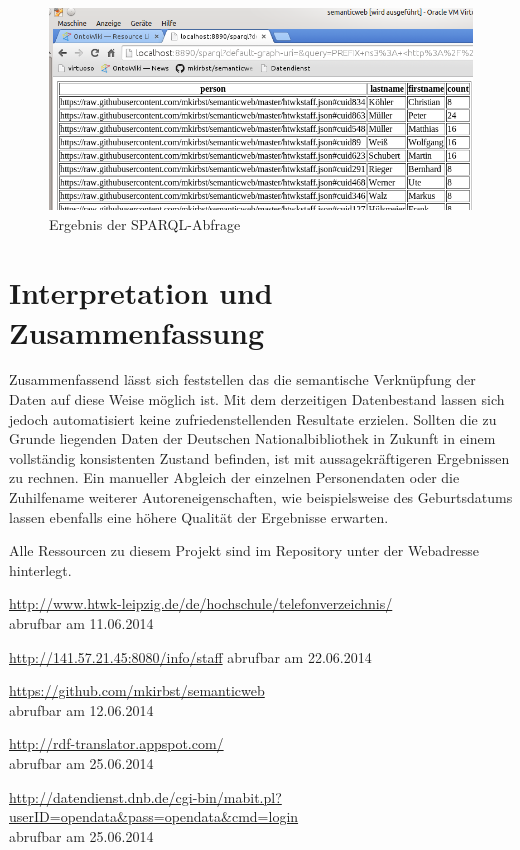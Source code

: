 \documentclass[parskip]{scrartcl}
\begin{document}
\begin{figure}[htb]
\begin{center}
 \includegraphics[width=1\hsize]{./images/querryresult.png}
 \end{center}
\caption[Ergebnis der SPARQL-Abfrage]{\label{querryresult}Ergebnis der SPARQL-Abfrage}
\end{figure}

\section{Interpretation und Zusammenfassung}
Zusammenfassend lässt sich feststellen das die semantische Verknüpfung der Daten auf diese Weise möglich ist. Mit dem derzeitigen Datenbestand lassen sich jedoch automatisiert keine zufriedenstellenden Resultate erzielen.
Sollten die zu Grunde liegenden Daten der Deutschen Nationalbibliothek in Zukunft in einem vollständig konsistenten Zustand befinden, ist mit aussagekräftigeren Ergebnissen zu rechnen. Ein manueller Abgleich der einzelnen Personendaten oder die Zuhilfename weiterer
Autoreneigenschaften, wie beispielsweise des Geburtsdatums lassen ebenfalls eine höhere Qualität der Ergebnisse erwarten.

Alle Ressourcen zu diesem Projekt sind im Repository unter der Webadresse \cite{gitmkirbstsm} hinterlegt.

%
%

\clearpage
\renewcommand\refname{Projektdokumentation}
\begin{thebibliography}{999}

\url{http://www.htwk-leipzig.de/de/hochschule/telefonverzeichnis/}\\
abrufbar am 11.06.2014

\url{http://141.57.21.45:8080/info/staff}
abrufbar am 22.06.2014

\url{https://github.com/mkirbst/semanticweb}\\
abrufbar am 12.06.2014


\url{http://rdf-translator.appspot.com/}\\
abrufbar am 25.06.2014


\url{http://datendienst.dnb.de/cgi-bin/mabit.pl?userID=opendata&pass=opendata&cmd=login}\\
abrufbar am 25.06.2014

\end{thebibliography}
\end{document}
